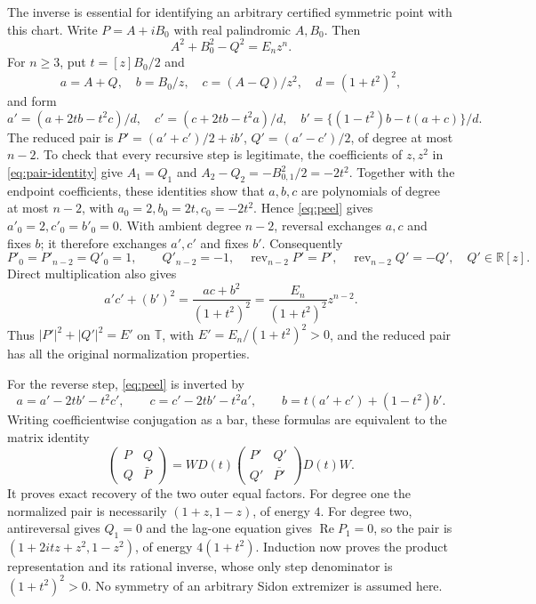 \documentclass[11pt]{article}
\newcommand{\T}{\mathbb T}
\newcommand{\R}{\mathbb R}
\newcommand{\Q}{\mathbb Q}
\DeclareMathOperator{\Rea}{Re}
\begin{document}
The inverse is essential for identifying an arbitrary certified symmetric
point with this chart. Write $P=A+iB_0$ with real palindromic $A,B_0$.
Then
\begin{equation}\label{eq:pair-identity}
 A^2+B_0^2-Q^2=E_nz^n.
\end{equation}
For $n\ge3$, put $t=[z]B_0/2$ and
\[
 a=A+Q,\quad b=B_0/z,\quad c=(A-Q)/z^2,\quad d=(1+t^2)^2,
\]
and form
\begin{equation}\label{eq:peel}
 a'=(a+2tb-t^2c)/d,\quad
 c'=(c+2tb-t^2a)/d,\quad
 b'=\{(1-t^2)b-t(a+c)\}/d.
\end{equation}
The reduced pair is
$P'=(a'+c')/2+ib'$, $Q'=(a'-c')/2$, of degree at most $n-2$.
To check that every recursive step is legitimate, the coefficients of
$z,z^2$ in \eqref{eq:pair-identity} give
$A_1=Q_1$ and $A_2-Q_2=-B_{0,1}^2/2=-2t^2$.
Together with the endpoint coefficients, these identities show that
$a,b,c$ are polynomials of degree at most $n-2$, with
$a_0=2,b_0=2t,c_0=-2t^2$. Hence \eqref{eq:peel} gives
$a'_0=2,c'_0=b'_0=0$.
With ambient degree $n-2$, reversal exchanges $a,c$ and fixes $b$;
it therefore exchanges $a',c'$ and fixes $b'$. Consequently
\[
 P'_0=P'_{n-2}=Q'_0=1,\qquad Q'_{n-2}=-1,
 \quad \operatorname{rev}_{n-2}P'=P',\quad
 \operatorname{rev}_{n-2}Q'=-Q',\quad Q'\in\R[z].
\]
Direct multiplication also gives
\[
 a'c'+(b')^2=\frac{ac+b^2}{(1+t^2)^2}
             =\frac{E_n}{(1+t^2)^2}z^{n-2}.
\]
Thus $|P'|^2+|Q'|^2=E'$ on $\T$, with
$E'=E_n/(1+t^2)^2>0$, and the reduced pair has all the original
normalization properties.

For the reverse step, \eqref{eq:peel} is inverted by
\[
 a=a'-2tb'-t^2c',\qquad c=c'-2tb'-t^2a',\qquad
 b=t(a'+c')+(1-t^2)b'.
\]
Writing coefficientwise conjugation as a bar, these formulas are
equivalent to the matrix identity
\[
 \begin{pmatrix}P&Q\\Q&\bar P\end{pmatrix}
 =W D(t)\begin{pmatrix}P'&Q'\\Q'&\overline{P'}\end{pmatrix}D(t)W.
\]
It proves exact recovery of the two outer equal factors. For degree
one the normalized pair is necessarily $(1+z,1-z)$, of energy $4$.
For degree two, antireversal gives $Q_1=0$ and the lag-one equation
gives $\Rea P_1=0$, so the pair is
$(1+2itz+z^2,1-z^2)$, of energy $4(1+t^2)$.
Induction now proves the product representation and its rational
inverse, whose only step denominator is $(1+t^2)^2>0$.
No symmetry of an arbitrary Sidon extremizer is assumed here.
\end{document}
